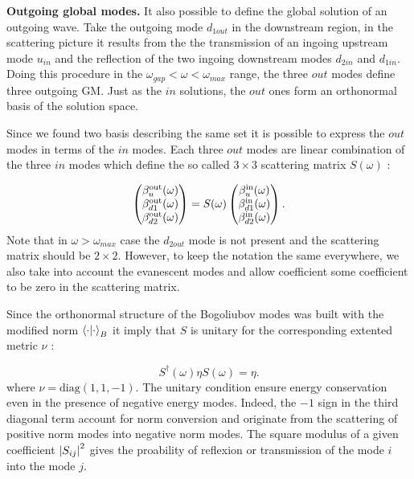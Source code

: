 \bigskip

\textbf{Outgoing global modes.} It also possible to define the global solution of an outgoing wave. Take the outgoing mode $d_{1out}$ in the downstream region, in the scattering picture it results from the 
 the transmission of an ingoing upstream mode $u_{in}$ and the reflection of the two ingoing downstream modes $d_{2in}$ and $d_{1in}$. Doing this procedure in the $\omega_{gap}<\omega<\omega_{max}$ range, the three $out$ modes
define three outgoing GM. Just as the $in$ solutions, the $out$ ones form an orthonormal basis of the solution space.

Since we found two basis describing the same set it is possible to express the $out$ modes in terms of the $in$ modes. 
Each three $out$ modes are linear combination of the three $in$ modes which define the so called $3\times3$ scattering matrix $S(\omega)$ :

\begin{equation}
    \begin{pmatrix}
        \beta^{\mathrm{out}}_{u}(\omega) \\
        \beta^{\mathrm{out}}_{d1}(\omega) \\
        \beta^{\mathrm{out}}_{d2}(\omega)
        \end{pmatrix} =
    S(\omega)\begin{pmatrix}
        \beta^{\mathrm{in}}_{u}(\omega) \\
        \beta^{\mathrm{in}}_{d1}(\omega) \\
        \beta^{\mathrm{in}}_{d2}(\omega)
    \end{pmatrix}.
    \label{eq:scattering_matrix}
\end{equation}
Note that in $\omega>\omega_{max}$ case the $d_{2out}$ mode is not present and the scattering matrix should be $2\times2$. However, to keep 
the notation the same everywhere, we also take into account the evanescent modes and allow coefficient some coefficient to be zero in the scattering matrix.

Since the orthonormal structure of the Bogoliubov modes was built with the modified norm $\bra{\cdot}\ket{\cdot}_B$ it imply
that $S$ is unitary for the corresponding extented metric $\nu$ :

\begin{equation}
    S^\dagger(\omega)\eta S(\omega) = \eta.
    \label{eq:unitarity}
\end{equation}
where $\nu=\mathrm{diag}(1,1,-1)$. The unitary condition ensure energy conservation even in the presence of negative energy modes.  Indeed, the $-1$ sign in the third diagonal term account for norm conversion and originate from the scattering of positive norm modes into negative norm modes.
The square modulus of a given coefficient $\abs{S_{ij}}^2$ gives the proability of reflexion or transmission of the mode $i$ into the mode $j$.

